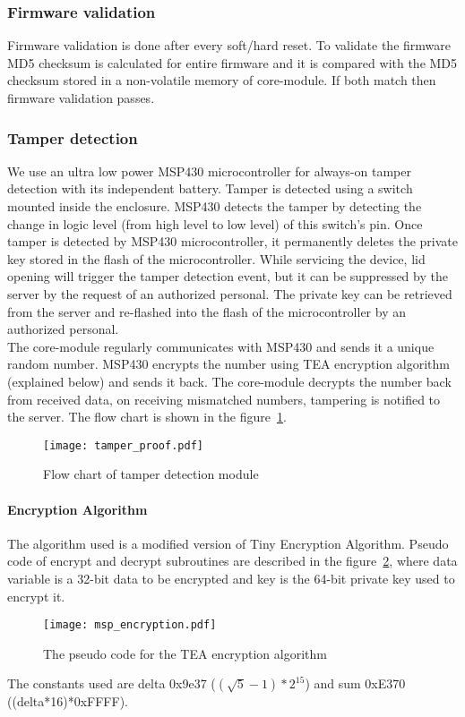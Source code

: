 \subsubsection{Firmware validation}
Firmware validation is done after every soft/hard reset. To validate the firmware MD5 checksum is calculated for entire firmware and it is compared with the MD5 checksum stored in a non-volatile memory of core-module. If both match then firmware validation passes.
\subsubsection{Tamper detection}
We use an ultra low power MSP430 microcontroller for always-on tamper detection with its independent battery. Tamper is detected using a switch mounted inside the enclosure. MSP430 detects the tamper by detecting the change in logic level (from high level to low level) of this switch's pin. Once tamper is detected by MSP430 microcontroller, it permanently deletes the private key stored in the flash of the microcontroller. While servicing the device, lid opening will trigger the tamper detection event, but it can be suppressed by the server by the request of an authorized personal. The private key can be retrieved from the server and re-flashed into the flash of the microcontroller by an authorized personal.\\
The core-module regularly communicates with MSP430 and sends it a unique random number. MSP430 encrypts the number using TEA encryption algorithm (explained below) and sends it back. The core-module decrypts the number back from received data, on receiving mismatched numbers, tampering is notified to the server. The flow chart is shown in the figure~\ref{fig:tamper_proof}.
\begin{figure}[H]
\centering
\texttt{[image: tamper\_proof.pdf]}
\caption{Flow chart of tamper detection module}
\label{fig:tamper_proof}
\end{figure}
\paragraph{Encryption Algorithm\\}
The algorithm used is a modified version of Tiny Encryption Algorithm\cite{tea_paper}. Pseudo code of encrypt and decrypt subroutines are described in the figure~\ref{fig:msp_encryption}, where data variable is a 32-bit data to be encrypted and key is the 64-bit private key used to encrypt it.
\begin{figure}[H]
\centering
\texttt{[image: msp\_encryption.pdf]}
\caption{The pseudo code for the TEA encryption algorithm}
\label{fig:msp_encryption}
\end{figure}
The constants used are delta 0x9e37 ($(\sqrt{5}-1)*2^{15}$) and sum 0xE370 ((delta*16)*0xFFFF).
